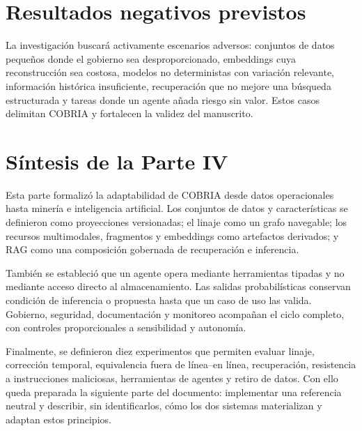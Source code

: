 \section{Resultados negativos previstos}

La investigación buscará activamente escenarios adversos: conjuntos de datos pequeños donde el
gobierno sea desproporcionado, embeddings cuya reconstrucción sea costosa, modelos no
deterministas con variación relevante, información histórica insuficiente, recuperación
que no mejore una búsqueda estructurada y tareas donde un agente añada riesgo sin valor.
Estos casos delimitan COBRIA y fortalecen la validez del manuscrito.

\section{Síntesis de la Parte IV}

Esta parte formalizó la adaptabilidad de COBRIA desde datos operacionales hasta minería
e inteligencia artificial. Los conjuntos de datos y características se definieron como
proyecciones versionadas; el linaje como un grafo navegable; los recursos multimodales,
fragmentos y embeddings como artefactos derivados; y RAG como una composición gobernada
de recuperación e inferencia.

También se estableció que un agente opera mediante herramientas tipadas y no mediante
acceso directo al almacenamiento. Las salidas probabilísticas conservan condición de
inferencia o propuesta hasta que un caso de uso las valida. Gobierno, seguridad,
documentación y monitoreo acompañan el ciclo completo, con controles proporcionales a
sensibilidad y autonomía.

Finalmente, se definieron diez experimentos que permiten evaluar linaje, corrección
temporal, equivalencia fuera de línea--en línea, recuperación, resistencia a instrucciones
maliciosas, herramientas de agentes y retiro de datos. Con ello queda preparada la
siguiente parte del documento: implementar una referencia neutral y describir, sin
identificarlos, cómo los dos sistemas materializan y adaptan estos principios.
